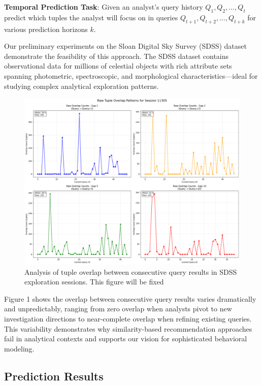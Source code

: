 \documentclass[sigconf, nonacm]{acmart}
\begin{document}
\textbf{Temporal Prediction Task}: Given an analyst's query history $Q_1, Q_2, \ldots, Q_t$ predict which tuples the analyst will focus on in queries $Q_{t+1}, Q_{t+2}, \ldots, Q_{t+k}$ for various prediction horizons $k$.

Our preliminary experiments on the Sloan Digital Sky Survey (SDSS) dataset \cite{york_sloan_2000} demonstrate the feasibility of this approach. The SDSS dataset contains observational data for millions of celestial objects with rich attribute sets spanning photometric, spectroscopic, and morphological characteristics—ideal for studying complex analytical exploration patterns.

\begin{figure}
\centering
\includegraphics[scale=0.2]{figures/Overlap-analysis.png} 
\caption{Analysis of tuple overlap between consecutive query results in SDSS exploration sessions. This figure will be fixed}
\end{figure}

Figure 1 shows the overlap between consecutive query results varies dramatically and unpredictably, ranging from zero overlap when analysts pivot to new investigation directions to near-complete overlap when refining existing queries. This variability demonstrates why similarity-based recommendation approaches fail in analytical contexts and supports our vision for sophisticated behavioral modeling.

\subsection{Prediction Results}
\end{document}
